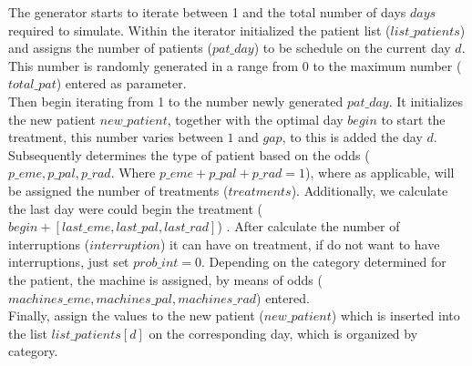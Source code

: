 
The generator starts to iterate between 1 and the total number of days $days$ required to simulate. Within the iterator initialized the patient list ($list\_patients $) and assigns the number of patients ($pat\_day$) to be schedule on the current day $d$. This number is randomly generated in a range from 0 to the maximum number ($total\_pat$) entered as parameter.\\
Then begin iterating from 1 to the number newly generated $pat\_day$. It initializes the new patient $new\_patient$, together with the optimal day $begin$ to start the treatment, this number varies between $1$ and $gap$, to this is added the day $d$. Subsequently determines the type of patient based on the odds ($p\_eme, p\_pal ,p\_rad$. Where $p\_eme + p\_pal + p\_rad = 1$), where as applicable, will be assigned the number of treatments ($treatments$). Additionally, we calculate the last day were could begin the treatment ($begin + [last\_eme, last\_pal ,last\_rad]$) . After calculate the number of interruptions ($interruption$) it can have on treatment, if do not want to have interruptions, just set $prob\_int = 0$. Depending on the category determined for the patient, the machine is assigned, by means of odds ($machines\_eme, machines\_pal ,machines\_rad$) entered.\\
Finally, assign the values to the new patient ($new\_patient$) which is inserted into the list $list\_patients[d]$ on the corresponding day, which is organized by category.

